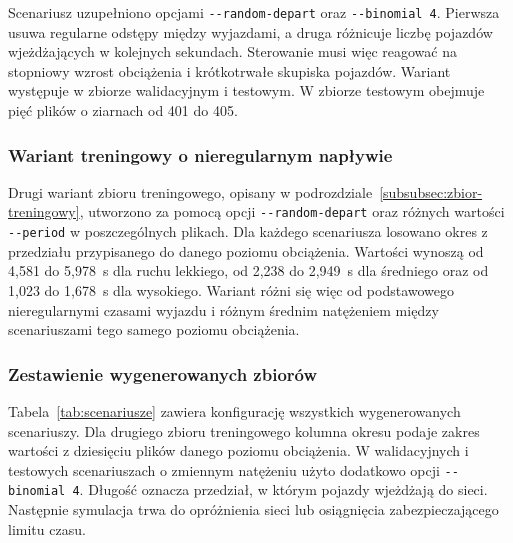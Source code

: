 {\setlength{\emergencystretch}{1em}
Scenariusz uzupełniono opcjami \texttt{-{}-random-depart} oraz \texttt{-{}-binomial 4}. Pierwsza usuwa regularne odstępy między wyjazdami, a druga różnicuje liczbę pojazdów wjeżdżających w kolejnych sekundach. Sterowanie musi więc reagować na stopniowy wzrost obciążenia i krótkotrwałe skupiska pojazdów. Wariant występuje w zbiorze walidacyjnym i testowym. W zbiorze testowym obejmuje pięć plików o ziarnach od 401 do 405.\par}

\subsubsection{Wariant treningowy o nieregularnym napływie}
\label{subsubsec:trening-nieregularny}

Drugi wariant zbioru treningowego, opisany w podrozdziale~\ref{subsubsec:zbior-treningowy}, utworzono za pomocą opcji \texttt{-{}-random-depart} oraz różnych wartości \texttt{-{}-period} w poszczególnych plikach. Dla każdego scenariusza losowano okres z przedziału przypisanego do danego poziomu obciążenia. Wartości wynoszą od 4,581 do 5,978~s dla ruchu lekkiego, od 2,238 do 2,949~s dla średniego oraz od 1,023 do 1,678~s dla wysokiego. Wariant różni się więc od podstawowego nieregularnymi czasami wyjazdu i różnym średnim natężeniem między scenariuszami tego samego poziomu obciążenia.

\subsubsection{Zestawienie wygenerowanych zbiorów}
\label{subsubsec:zestawienie-zbiorow}

Tabela~\ref{tab:scenariusze} zawiera konfigurację wszystkich wygenerowanych scenariuszy. Dla drugiego zbioru treningowego kolumna okresu podaje zakres wartości z dziesięciu plików danego poziomu obciążenia. W walidacyjnych i testowych scenariuszach o zmiennym natężeniu użyto dodatkowo opcji \texttt{-{}-binomial 4}. Długość oznacza przedział, w którym pojazdy wjeżdżają do sieci. Następnie symulacja trwa do opróżnienia sieci lub osiągnięcia zabezpieczającego limitu czasu.

